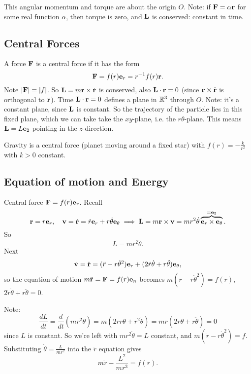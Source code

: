 \documentclass[10pt, a4paper]{article}
\begin{document}
This angular momentum and torque are about the origin $O$.
Note:
if $\mathbf{F} = \alpha\mathbf{r}$ for some real function $\alpha$,
then torque is zero,
and $\mathbf{L}$ is conserved:
constant in time.

\subsection{Central Forces}
A force $\mathbf{F}$ is a central force if it has the form
\[
\mathbf{F} = f(r)\mathbf{e}_r = r ^ {-1}f(r)\mathbf{r}.
\]
Note $|\mathbf{F}| = |f|$.
So $\mathbf{L} = m\mathbf{r} \times \dot{\mathbf{r}}$ is conserved,
also $\mathbf{L} \cdot \mathbf{r} = 0$
(since $\mathbf{r} \times \dot{\mathbf{r}}$ is orthogonal to $\mathbf{r}$).
Time $\mathbf{L} \cdot \mathbf{r} = 0$ defines a plane in $\mathbb{R} ^ 3$ through $O$.
Note:
it's a constant plane,
since $\mathbf{L}$ is constant.
So the trajectory of the particle lies in this fixed plane,
which we can take take the $xy$-plane,
i.e. the $r\theta$-plane.
This means $\mathbf{L} = L\mathbf{e}_2$ pointing in the $z$-direction.

\begin{example}
    Gravity is a central force
    (planet moving around a fixed star)
    with $f(r) = -\frac{k}{r ^ 2}$ with $k > 0$ constant.
\end{example}

\subsection{Equation of motion and Energy}
Central force $\mathbf{F} = f(r)\mathbf{e}_r$.
Recall
\[
\mathbf{r} = r\mathbf{e}_r,\quad\mathbf{v} = \dot{\mathbf{r}} = \dot{r}\mathbf{e}_r + r\dot{\theta}\mathbf{e}_{\theta} \implies \mathbf{L} = m\mathbf{r} \times \mathbf{v} = mr ^ 2\dot{\theta}\overbrace{\mathbf{e}_r \times \mathbf{e}_{\theta}} ^ {=\mathbf{e}_3}.
\]
So
\[
L = mr ^ 2\dot{\theta}.
\]
Next
\[
\dot{\mathbf{v}} = \ddot{\mathbf{r}} = (\ddot{r} - r\dot{\theta} ^ 2)\mathbf{e}_r + (2\dot{r}\dot{\theta} + r\ddot{\theta})\mathbf{e}_{\theta},
\]
so the equation of motion $m\ddot{\mathbf{r}} = \mathbf{F} = f(r)\mathbf{e}_n$ becomes $m(\ddot{r} - r\dot{\theta} ^ 2) = f(r)$,
$2\dot{r}\dot{\theta} + r\ddot{\theta} = 0$.

Note:
\[
\frac{dL}{dt} = \frac{d}{dt}(mr ^ 2\dot{\theta}) = m(2r\dot{r}\dot{\theta} + r ^ 2\ddot{\theta}) = mr(2\dot{r}\dot{\theta} + r\ddot{\theta}) = 0
\]
since $L$ is constant.
So we're left with $mr ^ 2\dot{\theta} = L$ constant,
and $m(\ddot{r} - r\dot{\theta} ^ 2) = f$.
Substituting $\dot{\theta} = \frac{L}{mr ^ 2}$ into the $\ddot{r}$ equation gives
\[
m\ddot{r} - \frac{L ^ 2}{mr ^ 3} = f(r).
\]
\end{document}
